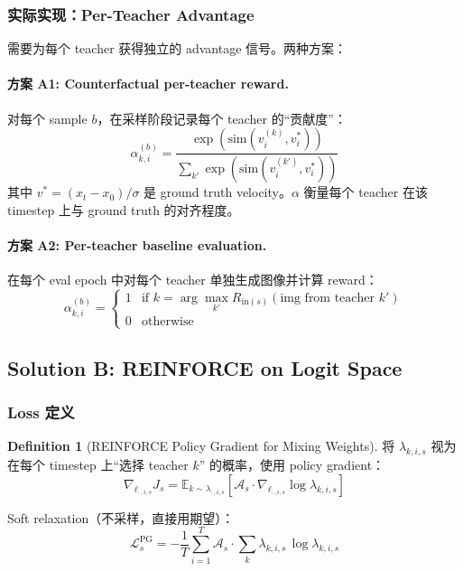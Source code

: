 \documentclass[11pt,a4paper]{article}
\newcommand{\loss}{\mathcal{L}}
\newcommand{\E}{\mathbb{E}}
\newcommand{\adv}{\mathcal{A}}
\theoremstyle{definition}
\newtheorem{definition}{Definition}
\begin{document}
\subsubsection{实际实现：Per-Teacher Advantage}

需要为每个 teacher 获得独立的 advantage 信号。两种方案：

\paragraph{方案 A1: Counterfactual per-teacher reward.}
对每个 sample $b$，在采样阶段记录每个 teacher 的``贡献度''：
\begin{equation}
\alpha^{(b)}_{k,i} = \frac{\exp(\text{sim}(v^{(k)}_i, v^*_i))}{\sum_{k'} \exp(\text{sim}(v^{(k')}_i, v^*_i))}
\end{equation}
其中 $v^* = (x_t - x_0)/\sigma$ 是 ground truth velocity。$\alpha$ 衡量每个 teacher 在该 timestep 上与 ground truth 的对齐程度。

\paragraph{方案 A2: Per-teacher baseline evaluation.}
在每个 eval epoch 中对每个 teacher 单独生成图像并计算 reward：
\begin{equation}
\alpha^{(b)}_{k,i} = \begin{cases}
1 & \text{if } k = \arg\max_{k'} R_{\mathrm{in}(s)}(\text{img from teacher } k') \\
0 & \text{otherwise}
\end{cases}
\end{equation}

\subsection{Solution B: REINFORCE on Logit Space}

\subsubsection{Loss 定义}

\begin{definition}[REINFORCE Policy Gradient for Mixing Weights]
将 $\lambda_{k,i,s}$ 视为在每个 timestep 上``选择 teacher $k$'' 的概率，使用 policy gradient：
\begin{equation}
\boxed{
\nabla_{\ell_{:,i,s}} J_s = \E_{k \sim \lambda_{:,i,s}}\left[\adv_s \cdot \nabla_{\ell_{:,i,s}} \log \lambda_{k,i,s}\right]
}
\label{eq:reinforce}
\end{equation}

Soft relaxation（不采样，直接用期望）：
\begin{equation}
\loss^{\mathrm{PG}}_s = -\frac{1}{T}\sum_{i=1}^T \adv_s \cdot \sum_k \lambda_{k,i,s}\, \log \lambda_{k,i,s}
\label{eq:soft_pg}
\end{equation}
\end{definition}
\end{document}
